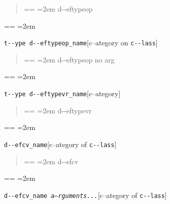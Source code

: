 \documentclass{book}
\makeatletter
\newenvironment{GNUTexinfopreformatted}{%
  \par\obeylines\obeyspaces\frenchspacing
  \parskip=\z@\parindent=\z@}{}
\makeatother
\begin{document}
%
\begin{quote}
\unskip{\parskip=0pt\noindent}%
\begin{GNUTexinfopreformatted}
\leftskip=2em\relax\ttfamily%
d{-}{-}eftypeop
\end{GNUTexinfopreformatted}
\end{quote}
\begin{GNUTexinfopreformatted}
\leftskip=2em\relax\ttfamily%

\end{GNUTexinfopreformatted}
\noindent\texttt{t{-}{-}ype d{-}{-}eftypeop\_name}\hfill[c--ategory on \texttt{c{-}{-}lass}]



%
\begin{quote}
\unskip{\parskip=0pt\noindent}%
\begin{GNUTexinfopreformatted}
\leftskip=2em\relax\ttfamily%
d{-}{-}eftypeop no arg
\end{GNUTexinfopreformatted}
\end{quote}
\begin{GNUTexinfopreformatted}
\leftskip=2em\relax\ttfamily%

\end{GNUTexinfopreformatted}
\noindent\texttt{t{-}{-}ype d{-}{-}eftypevr\_name}\hfill[c--ategory]



%
\begin{quote}
\unskip{\parskip=0pt\noindent}%
\begin{GNUTexinfopreformatted}
\leftskip=2em\relax\ttfamily%
d{-}{-}eftypevr
\end{GNUTexinfopreformatted}
\end{quote}
\begin{GNUTexinfopreformatted}
\leftskip=2em\relax\ttfamily%

\end{GNUTexinfopreformatted}
\noindent\texttt{d{-}{-}efcv\_name}\hfill[c--ategory of \texttt{c{-}{-}lass}]



%
\begin{quote}
\unskip{\parskip=0pt\noindent}%
\begin{GNUTexinfopreformatted}
\leftskip=2em\relax\ttfamily%
d{-}{-}efcv
\end{GNUTexinfopreformatted}
\end{quote}
\begin{GNUTexinfopreformatted}
\leftskip=2em\relax\ttfamily%

\end{GNUTexinfopreformatted}
\noindent\texttt{d{-}{-}efcv\_name \EmbracOn{}\textnormal{\textsl{a--rguments...}}\EmbracOff{}}\hfill[c--ategory of \texttt{c{-}{-}lass}]
\end{document}

